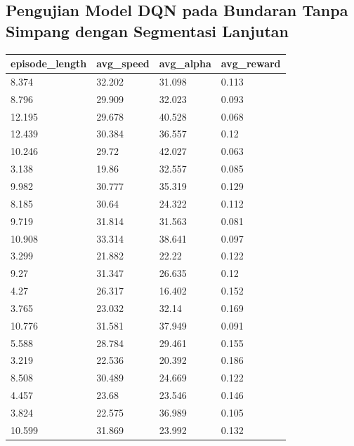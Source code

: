 \documentclass[conference]{IEEEtran}
\begin{document}
	\subsection{Pengujian Model DQN pada Bundaran Tanpa Simpang dengan Segmentasi Lanjutan}
	\label{sec:pengujian_dqn_bundaran_nosimpang_segmentasi_hitam_putih}
	
	\begin{table}[H]
		\begin{tabular}{|l|l|l|l|}
			\hline
			episode\_length & avg\_speed  & avg\_alpha  & avg\_reward \\ \hline
			8.374           & 32.202 & 31.098 & 0.113  \\ \hline
			8.796           & 29.909 & 32.023 & 0.093  \\ \hline
			12.195          & 29.678 & 40.528 & 0.068  \\ \hline
			12.439          & 30.384 & 36.557 & 0.12   \\ \hline
			10.246          & 29.72  & 42.027 & 0.063  \\ \hline
			3.138           & 19.86  & 32.557 & 0.085  \\ \hline
			9.982           & 30.777 & 35.319 & 0.129  \\ \hline
			8.185           & 30.64  & 24.322 & 0.112  \\ \hline
			9.719           & 31.814 & 31.563 & 0.081  \\ \hline
			10.908          & 33.314 & 38.641 & 0.097  \\ \hline
			3.299           & 21.882 & 22.22  & 0.122  \\ \hline
			9.27            & 31.347 & 26.635 & 0.12   \\ \hline
			4.27            & 26.317 & 16.402 & 0.152  \\ \hline
			3.765           & 23.032 & 32.14  & 0.169  \\ \hline
			10.776          & 31.581 & 37.949 & 0.091  \\ \hline
			5.588           & 28.784 & 29.461 & 0.155  \\ \hline
			3.219           & 22.536 & 20.392 & 0.186  \\ \hline
			8.508           & 30.489 & 24.669 & 0.122  \\ \hline
			4.457           & 23.68  & 23.546 & 0.146  \\ \hline
			3.824           & 22.575 & 36.989 & 0.105  \\ \hline
			10.599          & 31.869 & 23.992 & 0.132  \\ \hline

\end{tabular}
\end{table}
\end{document}
